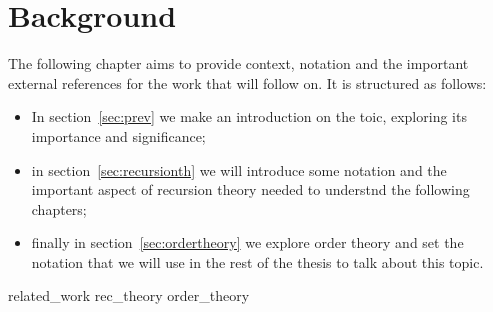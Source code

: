 \chapter{Background}

The following chapter aims to provide context, notation and the
important external references for the work that will follow on. It is
structured as follows:

\begin{itemize}
\item In section~\ref{sec:prev} we make an introduction on the toic,
  exploring its importance and significance;
\item in section~\ref{sec:recursionth} we will introduce some notation
  and the important aspect of recursion theory needed to understnd the
  following chapters;
\item finally in section~\ref{sec:ordertheory} we explore order theory
  and set the notation that we will use in the rest of the thesis to
  talk about this topic.
\end{itemize}

{related_work}
{rec_theory}
{order_theory}

